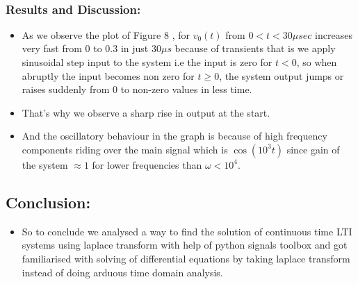 \documentclass[11pt]{article}
\providecommand{\tightlist}{%
      \setlength{\itemsep}{0pt}\setlength{\parskip}{0pt}}
\begin{document}
    \begin{center}
    \end{center}
    { \hspace*{\fill} \\}
    
    \subsubsection{Results and Discussion:}\label{results-and-discussion}

\begin{itemize}
\tightlist
\item
  As we observe the plot of Figure 8 , for \(v_0(t)\) from
  \(0<t<30\mu sec\) increases very fast from 0 to 0.3 in just
  \(30\mu s\) because of transients that is we apply sinusoidal step
  input to the system i.e the input is zero for \(t<0\), so when
  abruptly the input becomes non zero for \(t \geq 0\), the system
  output jumps or raises suddenly from 0 to non-zero values in less
  time.
\item
  That's why we observe a sharp rise in output at the start.
\item
  And the oscillatory behaviour in the graph is because of high
  frequency components riding over the main signal which is
  \(\cos(10^{3}t)\) since gain of the system \(\approx 1\) for lower
  frequencies than \(\omega < 10^4\).
\end{itemize}

    \subsection{Conclusion:}\label{conclusion}

\begin{itemize}
\tightlist
\item
  So to conclude we analysed a way to find the solution of continuous
  time LTI systems using laplace transform with help of python signals
  toolbox and got familiarised with solving of differential equations by
  taking laplace transform instead of doing arduous time domain
  analysis.
\end{itemize}


    
    
    
    
\end{document}
